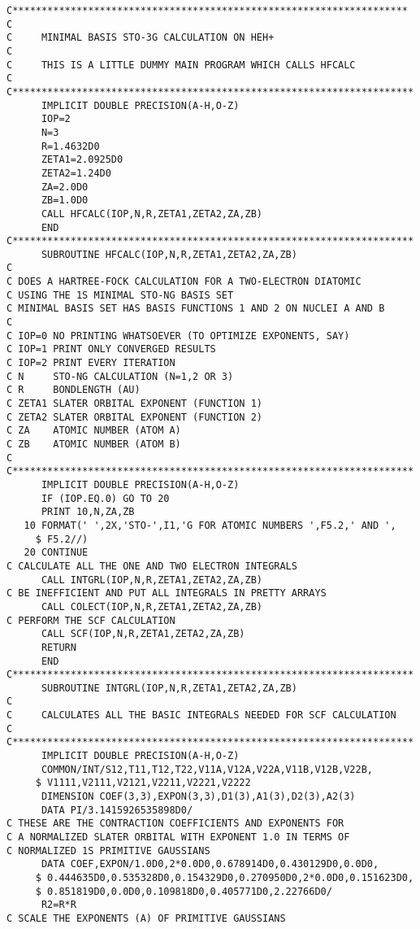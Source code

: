 \begin{verbatim}
C********************************************************************
C
C     MINIMAL BASIS STO-3G CALCULATION ON HEH+
C
C     THIS IS A LITTLE DUMMY MAIN PROGRAM WHICH CALLS HFCALC
C
C*********************************************************************
      IMPLICIT DOUBLE PRECISION(A-H,O-Z)
      IOP=2
      N=3
      R=1.4632D0
      ZETA1=2.0925D0
      ZETA2=1.24D0
      ZA=2.0D0
      ZB=1.0D0
      CALL HFCALC(IOP,N,R,ZETA1,ZETA2,ZA,ZB)
      END
C*********************************************************************
      SUBROUTINE HFCALC(IOP,N,R,ZETA1,ZETA2,ZA,ZB)
C
C DOES A HARTREE-FOCK CALCULATION FOR A TWO-ELECTRON DIATOMIC
C USING THE 1S MINIMAL STO-NG BASIS SET
C MINIMAL BASIS SET HAS BASIS FUNCTIONS 1 AND 2 ON NUCLEI A AND B
C
C IOP=0 NO PRINTING WHATSOEVER (TO OPTIMIZE EXPONENTS, SAY)
C IOP=1 PRINT ONLY CONVERGED RESULTS
C IOP=2 PRINT EVERY ITERATION
C N     STO-NG CALCULATION (N=1,2 OR 3)
C R     BONDLENGTH (AU)
C ZETA1 SLATER ORBITAL EXPONENT (FUNCTION 1)
C ZETA2 SLATER ORBITAL EXPONENT (FUNCTION 2)
C ZA    ATOMIC NUMBER (ATOM A)
C ZB    ATOMIC NUMBER (ATOM B)
C
C*********************************************************************
      IMPLICIT DOUBLE PRECISION(A-H,O-Z)
      IF (IOP.EQ.0) GO TO 20
      PRINT 10,N,ZA,ZB
   10 FORMAT(' ',2X,'STO-',I1,'G FOR ATOMIC NUMBERS ',F5.2,' AND ',
     $ F5.2//)
   20 CONTINUE
C CALCULATE ALL THE ONE AND TWO ELECTRON INTEGRALS
      CALL INTGRL(IOP,N,R,ZETA1,ZETA2,ZA,ZB)
C BE INEFFICIENT AND PUT ALL INTEGRALS IN PRETTY ARRAYS
      CALL COLECT(IOP,N,R,ZETA1,ZETA2,ZA,ZB)
C PERFORM THE SCF CALCULATION
      CALL SCF(IOP,N,R,ZETA1,ZETA2,ZA,ZB)
      RETURN
      END
C*********************************************************************
      SUBROUTINE INTGRL(IOP,N,R,ZETA1,ZETA2,ZA,ZB)
C
C     CALCULATES ALL THE BASIC INTEGRALS NEEDED FOR SCF CALCULATION
C
C*********************************************************************
      IMPLICIT DOUBLE PRECISION(A-H,O-Z)
      COMMON/INT/S12,T11,T12,T22,V11A,V12A,V22A,V11B,V12B,V22B,
     $ V1111,V2111,V2121,V2211,V2221,V2222
      DIMENSION COEF(3,3),EXPON(3,3),D1(3),A1(3),D2(3),A2(3)
      DATA PI/3.1415926535898D0/
C THESE ARE THE CONTRACTION COEFFICIENTS AND EXPONENTS FOR
C A NORMALIZED SLATER ORBITAL WITH EXPONENT 1.0 IN TERMS OF
C NORMALIZED 1S PRIMITIVE GAUSSIANS
      DATA COEF,EXPON/1.0D0,2*0.0D0,0.678914D0,0.430129D0,0.0D0,
     $ 0.444635D0,0.535328D0,0.154329D0,0.270950D0,2*0.0D0,0.151623D0,
     $ 0.851819D0,0.0D0,0.109818D0,0.405771D0,2.22766D0/
      R2=R*R
C SCALE THE EXPONENTS (A) OF PRIMITIVE GAUSSIANS

\end{verbatim}
